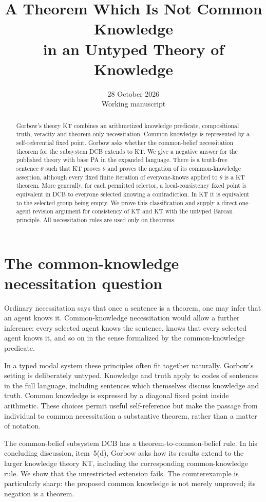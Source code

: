 \documentclass[11pt]{article}
\title{A Theorem Which Is Not Common Knowledge\\in an Untyped Theory of Knowledge}
\author{}
\date{28 October 2026\\Working manuscript}
\begin{document}
\maketitle
\begin{abstract}
Gorbow's theory KT combines an arithmetized knowledge predicate,
compositional truth, veracity and theorem-only necessitation. Common
knowledge is represented by a self-referential fixed point. Gorbow asks
whether the common-belief necessitation theorem for the subsystem DCB
extends to KT. We give a negative answer for the published theory with
base PA in the expanded language. There is a truth-free sentence
$\theta$ such that KT proves $\theta$ and proves the negation of its
common-knowledge assertion, although every fixed finite iteration of
everyone-knows applied to $\theta$ is a KT theorem. More generally, for
each permitted selector, a local-consistency fixed point is equivalent
in DCB to everyone selected knowing a contradiction. In KT it is
equivalent to the selected group being empty. We prove this classification
and supply a direct one-agent revision argument for consistency of KT
and KT with the untyped Barcan principle. All necessitation rules are
used only on theorems.
\end{abstract}
\tableofcontents

\section{The common-knowledge necessitation question}

Ordinary necessitation says that once a sentence is a theorem, one may
infer that an agent knows it. Common-knowledge necessitation would allow
a further inference: every selected agent knows the sentence, knows
that every selected agent knows it, and so on in the sense formalized
by the common-knowledge predicate.

In a typed modal system these principles often fit together naturally.
Gorbow's setting \cite{Gorbow} is deliberately untyped. Knowledge and
truth apply to codes of sentences in the full language, including
sentences which themselves discuss knowledge and truth. Common knowledge
is expressed by a diagonal fixed point inside arithmetic. These choices
permit useful self-reference but make the passage from individual to
common necessitation a substantive theorem, rather than a matter of
notation.

The common-belief subsystem DCB has a theorem-to-common-belief rule.
In his concluding discussion, item~5(d), Gorbow asks how its results
extend to the larger knowledge theory KT, including the corresponding
common-knowledge rule. We show that the unrestricted extension fails.
The counterexample is particularly sharp: the proposed common knowledge
is not merely unproved; its negation is a theorem.
\end{document}
